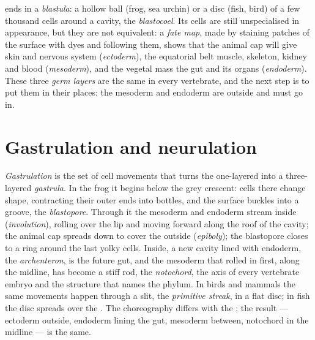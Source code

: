 \begin{definition}[Blastula]\label{def:b2:vertebrate-development:blastula}
 ends in a \emph{blastula}: a hollow ball (frog, sea urchin)
or a disc (fish, bird) of a few thousand cells around a cavity, the
\emph{blastocoel}. Its cells are still unspecialised in appearance,
but they are not equivalent: a \emph{fate map}, made by staining
patches of the surface with dyes and following them, shows that the
animal cap will give skin and nervous system (\emph{ectoderm}), the
equatorial belt muscle, skeleton, kidney and blood
(\emph{mesoderm}), and the vegetal mass the gut and its organs
(\emph{endoderm}). These three \emph{germ layers} are the same in
every vertebrate, and the next step is to put them in their places:
the mesoderm and endoderm are outside and must go in.
\end{definition}

\section{Gastrulation and neurulation}

\begin{proposition}[Gastrulation]\label{prop:b2:vertebrate-development:gastrulation}
\emph{Gastrulation} is the set of cell movements that turns the
one-layered  into a three-layered \emph{gastrula}. In the
frog it begins below the grey crescent: cells there change shape,
contracting their outer ends into bottles, and the surface buckles
into a groove, the \emph{blastopore}. Through it the mesoderm and
endoderm stream inside (\emph{involution}), rolling over the lip
and moving forward along the roof of the cavity; the animal cap
spreads down to cover the outside (\emph{epiboly}); the blastopore
closes to a ring around the last yolky cells. Inside, a new cavity
lined with endoderm, the \emph{archenteron}, is the future gut, and
the mesoderm that rolled in first, along the midline, has become a
stiff rod, the \emph{notochord}, the axis of every vertebrate embryo
and the structure that names the phylum. In birds and mammals the
same movements happen through a slit, the \emph{primitive streak},
in a flat disc; in fish the disc spreads over the . The
choreography differs with the ; the result --- ectoderm outside,
endoderm lining the gut, mesoderm between, notochord in the midline
--- is the same.
\end{proposition}

